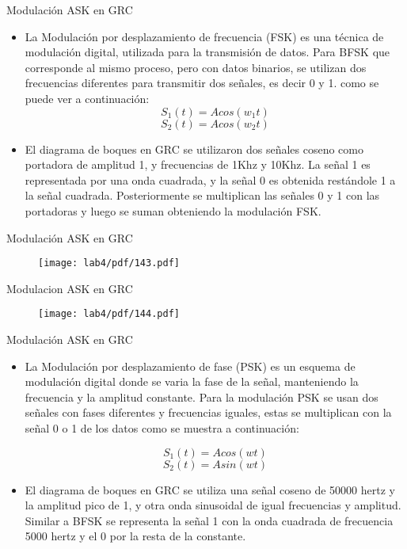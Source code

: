 \begin{frame}{Modulación ASK en GRC}
  \begin{itemize}
  \item {
La Modulación por desplazamiento de frecuencia (FSK) es una
técnica de modulación digital, utilizada para la transmisión de
datos. Para BFSK que corresponde al mismo proceso, pero con
datos binarios, se utilizan dos frecuencias diferentes para
transmitir dos señales, es decir 0 y 1. como se puede ver a
continuación:
$$ S_{1}(t)=Acos(w_{1}t)$$
$$S_{2}(t)=Acos(w_{2}t)$$
  }
  \item {
El diagrama de boques en GRC se utilizaron dos señales
coseno como portadora de amplitud 1, y frecuencias de 1Khz y
10Khz. La señal 1 es representada por una onda cuadrada, y la
señal 0 es obtenida restándole 1 a la señal cuadrada.
Posteriormente se multiplican las señales 0 y 1 con las
portadoras y luego se suman obteniendo la modulación FSK.
  }
  \end{itemize}
\end{frame}


\begin{frame}{Modulación ASK en GRC}
\begin{figure}[H]
\centering
\texttt{[image: lab4/pdf/143.pdf]}
\end{figure}
\end{frame}

\begin{frame}{Modulacion ASK en GRC}
\begin{figure}[H]
\centering
\texttt{[image: lab4/pdf/144.pdf]}
\end{figure}
\end{frame}

\begin{frame}{Modulación ASK en GRC}
  \begin{itemize}
  \item {
La Modulación por desplazamiento de fase (PSK) es un
esquema de modulación digital donde se varia la fase de la señal, manteniendo la frecuencia y la amplitud constante. Para la modulación PSK se usan dos señales con fases diferentes y frecuencias iguales, estas se multiplican con la señal 0 o 1 de los datos como se muestra a continuación:

$$S_{1}(t)=Acos(wt)$$
$$S_{2}(t)=Asin(wt)$$

  }
  \item {
El diagrama de boques en GRC se utiliza una señal coseno de
50000 hertz y la amplitud pico de 1, y otra onda sinusoidal de
igual frecuencias y amplitud. Similar a BFSK se representa la
señal 1 con la onda cuadrada de frecuencia 5000 hertz y el 0
por la resta de la constante.
  }
  \end{itemize}
\end{frame}

